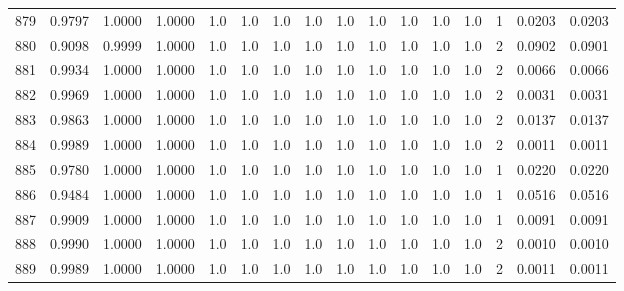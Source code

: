 \begin{tabular}{lrrrrrrrrrrrrrrr}
879 &      0.9797 &  1.0000 &  1.0000 &     1.0 &     1.0 &     1.0 &     1.0 &     1.0 &     1.0 &     1.0 &      1.0 &        1.0 &      1 &                    0.0203 &                     0.0203 \\
880 &      0.9098 &  0.9999 &  1.0000 &     1.0 &     1.0 &     1.0 &     1.0 &     1.0 &     1.0 &     1.0 &      1.0 &        1.0 &      2 &                    0.0902 &                     0.0901 \\
881 &      0.9934 &  1.0000 &  1.0000 &     1.0 &     1.0 &     1.0 &     1.0 &     1.0 &     1.0 &     1.0 &      1.0 &        1.0 &      2 &                    0.0066 &                     0.0066 \\
882 &      0.9969 &  1.0000 &  1.0000 &     1.0 &     1.0 &     1.0 &     1.0 &     1.0 &     1.0 &     1.0 &      1.0 &        1.0 &      2 &                    0.0031 &                     0.0031 \\
883 &      0.9863 &  1.0000 &  1.0000 &     1.0 &     1.0 &     1.0 &     1.0 &     1.0 &     1.0 &     1.0 &      1.0 &        1.0 &      2 &                    0.0137 &                     0.0137 \\
884 &      0.9989 &  1.0000 &  1.0000 &     1.0 &     1.0 &     1.0 &     1.0 &     1.0 &     1.0 &     1.0 &      1.0 &        1.0 &      2 &                    0.0011 &                     0.0011 \\
885 &      0.9780 &  1.0000 &  1.0000 &     1.0 &     1.0 &     1.0 &     1.0 &     1.0 &     1.0 &     1.0 &      1.0 &        1.0 &      1 &                    0.0220 &                     0.0220 \\
886 &      0.9484 &  1.0000 &  1.0000 &     1.0 &     1.0 &     1.0 &     1.0 &     1.0 &     1.0 &     1.0 &      1.0 &        1.0 &      1 &                    0.0516 &                     0.0516 \\
887 &      0.9909 &  1.0000 &  1.0000 &     1.0 &     1.0 &     1.0 &     1.0 &     1.0 &     1.0 &     1.0 &      1.0 &        1.0 &      1 &                    0.0091 &                     0.0091 \\
888 &      0.9990 &  1.0000 &  1.0000 &     1.0 &     1.0 &     1.0 &     1.0 &     1.0 &     1.0 &     1.0 &      1.0 &        1.0 &      2 &                    0.0010 &                     0.0010 \\
889 &      0.9989 &  1.0000 &  1.0000 &     1.0 &     1.0 &     1.0 &     1.0 &     1.0 &     1.0 &     1.0 &      1.0 &        1.0 &      2 &                    0.0011 &                     0.0011 \\

\end{tabular}
